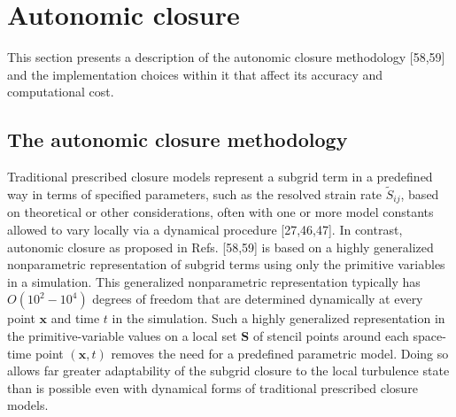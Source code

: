 \graphicspath{ {./Ch3/}  } 

\chapter{Autonomic closure}

This section presents a description of the autonomic closure methodology [58,59] and the implementation choices within it that affect its accuracy and computational cost. 
 
\section{The autonomic closure methodology} 

 Traditional prescribed closure models represent a subgrid term in a predefined way in terms of specified parameters, such as the resolved strain rate $\widetilde{S}_{ij} $, based on theoretical or other considerations, often with one or more model constants allowed to vary locally via a dynamical procedure [27,46,47]. 
 In contrast, autonomic closure as proposed in Refs. [58,59] is based on a highly generalized nonparametric representation of subgrid terms using only the primitive variables in a simulation. 
 This generalized nonparametric representation typically has $O(10^2-10^4)$ degrees of freedom that are determined dynamically at every point $\mathbf{x}$  and time $t$ in the simulation. 
 Such a highly generalized representation in the primitive-variable values on a local set $\mathbf{S}$ of stencil points around each space-time point $(\mathbf{x},t)$ removes the need for a predefined parametric model. 
 Doing so allows far greater adaptability of the subgrid closure to the local turbulence state than is possible even with dynamical forms of traditional prescribed closure models. 

